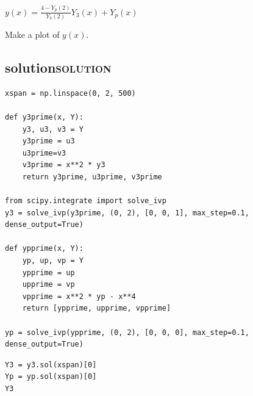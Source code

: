 \documentclass[11pt]{article}
\begin{document}
\(y(x) = \frac{4 - Y_p(2)}{Y_3(2)} Y_3(x) + Y_p(x)\)

Make a plot of \(y(x)\).


\subsection{solution\hfill{}\textsc{solution}}
\label{sec:org5e78aac}

\begin{verbatim}
xspan = np.linspace(0, 2, 500)

def y3prime(x, Y):
    y3, u3, v3 = Y
    y3prime = u3
    u3prime=v3
    v3prime = x**2 * y3
    return y3prime, u3prime, v3prime

from scipy.integrate import solve_ivp
y3 = solve_ivp(y3prime, (0, 2), [0, 0, 1], max_step=0.1, dense_output=True)

def ypprime(x, Y):
    yp, up, vp = Y
    ypprime = up
    upprime = vp
    vpprime = x**2 * yp - x**4
    return [ypprime, upprime, vpprime]

yp = solve_ivp(ypprime, (0, 2), [0, 0, 0], max_step=0.1, dense_output=True)
\end{verbatim}

\begin{verbatim}
Y3 = y3.sol(xspan)[0]
Yp = yp.sol(xspan)[0]
Y3
\end{verbatim}
\end{document}
